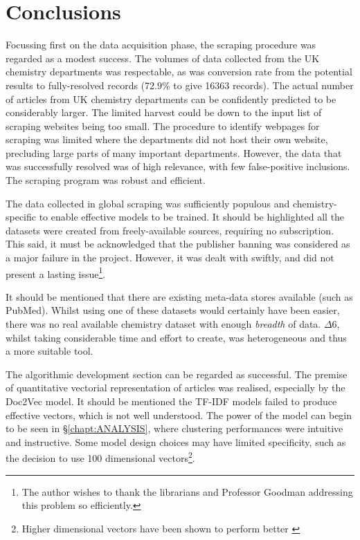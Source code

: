 \chapter{Conclusions}
Focussing first on the data acquisition phase, the scraping procedure was regarded as a modest success. The volumes of data collected from the UK chemistry departments was respectable, as was conversion rate from the potential results to fully-resolved records (72.9\%  to give 16363 records). The actual number of articles from UK chemistry departments can be confidently predicted to be considerably larger. The limited harvest could be down to the input list of scraping websites being too small. The procedure to identify webpages for scraping was limited where the departments did not host their own website, precluding large parts of many important departments.  However, the data that was successfully resolved was of high relevance, with few false-positive inclusions. The scraping program was robust and efficient.

The data collected in global scraping was sufficiently populous and chemistry-specific  to enable effective models to be trained. It should be highlighted all the datasets were created from freely-available sources, requiring no subscription. This said, it must be acknowledged that the publisher banning was considered as a major failure in the project. However, it was dealt with swiftly, and did not present a lasting issue\footnote{The author wishes to thank the librarians and Professor Goodman addressing this problem so efficiently.}.

 It should be mentioned that there are existing meta-data stores available (such as PubMed). Whilst using one of these datasets would certainly have been easier, there was no real available chemistry dataset with enough \emph{breadth} of data. $\Delta6$, whilst taking considerable time and effort to create, was heterogeneous and thus a more suitable tool.

The algorithmic development section can be regarded as successful. The premise of quantitative vectorial representation of articles was realised, especially by the Doc2Vec model. It should be mentioned the TF-IDF models failed to produce effective vectors, which is not well understood. The power of the model can begin to be seen in \S\ref{chapt:ANALYSIS}, where clustering performances were intuitive and instructive.
Some model design choices may have limited specificity, such as the decision to use 100 dimensional vectors\footnote{Higher dimensional vectors have been shown to perform better \cite{word2vec1}}.

